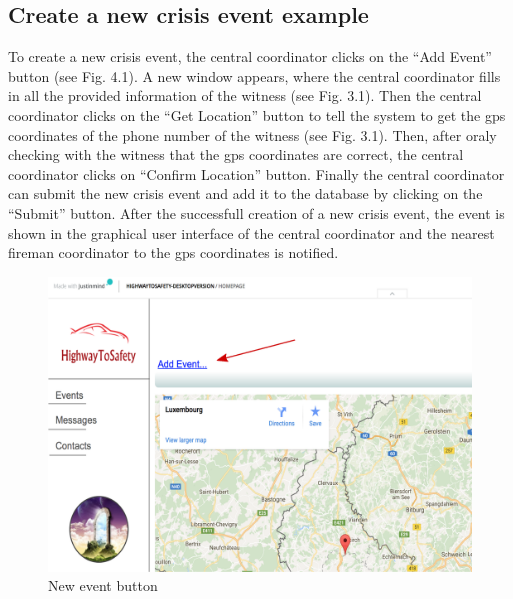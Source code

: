 \subsection{Create a new crisis event example}
To create a new crisis event, the central coordinator clicks on the “Add Event”
button (see Fig. 4.1). A new window appears, where the central coordinator fills
in all the provided information of the witness (see Fig. 3.1). Then the central
coordinator clicks on the “Get Location” button to tell the system to get the gps coordinates of the phone
number of the witness (see Fig. 3.1). Then, after oraly checking with the
witness that the gps coordinates are correct, the central coordinator clicks on
“Confirm Location” button.
Finally the central coordinator can submit the new crisis event and add it to
the database by clicking on the “Submit” button. After the successfull creation
of a new crisis event, the event is shown in the graphical user interface of the
central coordinator and the nearest fireman coordinator to the gps coordinates
is notified.
\begin{minipage}{0.9\textwidth}
\begin{figure}[H]
\caption{New event button}
\includegraphics[width=1.0\textwidth]{Add_event.eps}
\end{figure}
\end{minipage}


